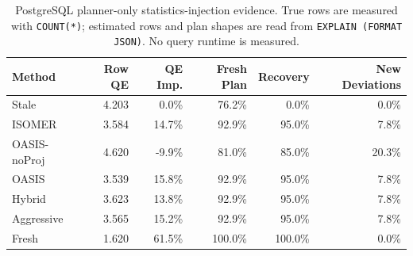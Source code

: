 \begin{table}[t]
  \centering
  \small
  \caption{PostgreSQL planner-only statistics-injection evidence. True rows are measured with \texttt{COUNT(*)}; estimated rows and plan shapes are read from \texttt{EXPLAIN (FORMAT JSON)}. No query runtime is measured.}
  \label{tab:postgres_planner_stats_injection}
  \setlength{\tabcolsep}{4pt}
  \begin{tabular}{lrrrrr}
    \toprule
    Method & Row QE & QE Imp. & Fresh Plan & Recovery & New Deviations \\
    \midrule
    Stale & 4.203 & 0.0\% & 76.2\% & 0.0\% & 0.0\% \\
    ISOMER & 3.584 & 14.7\% & 92.9\% & 95.0\% & 7.8\% \\
    OASIS-noProj & 4.620 & -9.9\% & 81.0\% & 85.0\% & 20.3\% \\
    OASIS & 3.539 & 15.8\% & 92.9\% & 95.0\% & 7.8\% \\
    Hybrid & 3.623 & 13.8\% & 92.9\% & 95.0\% & 7.8\% \\
    Aggressive & 3.565 & 15.2\% & 92.9\% & 95.0\% & 7.8\% \\
    Fresh & 1.620 & 61.5\% & 100.0\% & 100.0\% & 0.0\% \\
    \bottomrule
  \end{tabular}
\end{table}
